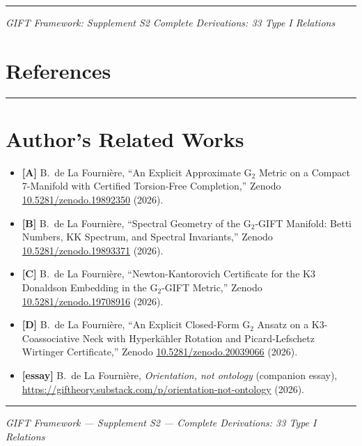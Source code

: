 \documentclass[11pt,a4paper]{article}
\begin{document}
\begin{center}\rule{0.5\linewidth}{0.5pt}\end{center}

\emph{GIFT Framework: Supplement S2}
\emph{Complete Derivations: 33 Type I Relations}


\section*{References}



\noindent\rule{\textwidth}{0.2pt}

\section*{Author's Related Works}
\begin{itemize}
\item \textbf{[A]} B.~de La Fourni\`ere, ``An Explicit Approximate $\mathrm{G}_2$ Metric on a Compact 7-Manifold with Certified Torsion-Free Completion,'' Zenodo \href{https://doi.org/10.5281/zenodo.19892350}{10.5281/zenodo.19892350} (2026).
\item \textbf{[B]} B.~de La Fourni\`ere, ``Spectral Geometry of the $\mathrm{G}_2$-GIFT Manifold: Betti Numbers, KK Spectrum, and Spectral Invariants,'' Zenodo \href{https://doi.org/10.5281/zenodo.19893371}{10.5281/zenodo.19893371} (2026).
\item \textbf{[C]} B.~de La Fourni\`ere, ``Newton-Kantorovich Certificate for the K3 Donaldson Embedding in the $\mathrm{G}_2$-GIFT Metric,'' Zenodo \href{https://doi.org/10.5281/zenodo.19708916}{10.5281/zenodo.19708916} (2026).
\item \textbf{[D]} B.~de La Fourni\`ere, ``An Explicit Closed-Form $\mathrm{G}_2$ Ansatz on a K3-Coassociative Neck with Hyperk\"ahler Rotation and Picard-Lefschetz Wirtinger Certificate,'' Zenodo \href{https://doi.org/10.5281/zenodo.20039066}{10.5281/zenodo.20039066} (2026).
\item \textbf{[essay]} B.~de La Fourni\`ere, \emph{Orientation, not ontology} (companion essay), \url{https://giftheory.substack.com/p/orientation-not-ontology} (2026).
\end{itemize}

\noindent\rule{\textwidth}{0.2pt}

\begin{center}
\emph{GIFT Framework --- Supplement S2 --- Complete Derivations: 33 Type I Relations}
\end{center}
\end{document}
